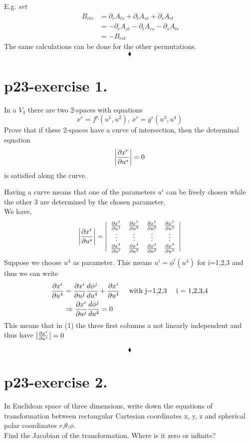 E.g. $srt$
\begin{align}
\ B_{rts} &= \partial_{r}{A_{ts}}+\partial_{t}{A_{sr}}+\partial_{s}{A_{rt}}\\
&= -\partial_{r}{A_{st}}-\partial_{t}{A_{rs}}-\partial_{s}{A_{tr}}\\
&= - B_{rst}
\end{align}
The same calculations can be done for the other permutations.
$$\blacklozenge$$
\pagebreak[4]

\section{p23-exercise 1.}
\begin{tcolorbox}
In a $V_{4}$ there are two 2-spaces with equations
$$x^r = f^r(u^1,u^2)\text{, }x^r = g^r(u^3,u^4) $$
Prove that if these 2-spaces have a curve of intersection, then the determinal equation
$$\left|\pdv{x^r}{u^s}\right| = 0$$
is satisfied along the curve.
\end{tcolorbox}
Having a curve means that one of the parameters $u^i$ can be freely chosen while the other 3 are determined by the chosen parameter.\\
We have,
\begin{align}
\left|\pdv{x^r}{u^s}\right| = \left| {\begin{array}{cccc}
    \pdv{x^1}{u^1} & \pdv{x^1}{u^2} & \pdv{x^1}{u^3} & \pdv{x^1}{u^4}\\
    \vdots & \vdots & \vdots & \vdots\\
    \pdv{x^4}{u^1} & \pdv{x^4}{u^2} & \pdv{x^4}{u^3} & \pdv{x^4}{u^4}\\
  \end{array} } \right|
\end{align}
Suppose we choose $u^4$ as parameter.
This means $u^i = \phi^i(u^4)$ for i=1,2,3 and thus we can write
\begin{align}
\pdv{x^i}{u^4} &= \pdv{x^i}{u^j}\dv{\phi^j}{u^4}+ \pdv{x^i}{u^4}\quad\text{ with j=1,2,3} \quad\text{  i = 1,2,3,4}\\
&\Rightarrow \pdv{x^i}{u^j}\dv{\phi^j}{u^4} = 0
\end{align}
This means that in (1) the three first columns a not linearly independent and thus have   $\left|\pdv{x^r}{u^s}\right| = 0$

$$\blacklozenge$$
\pagebreak[4]

\section{p23-exercise 2.}
\begin{tcolorbox}
In Euclidean space of three dimensions, write down the equations of transformation between rectangular Cartesian coordinates x, y, z and spherical polar coordinates $r$,$\theta$,$\phi$.\\
Find the Jacobian of the transformation. Where is it zero or infinite?
\end{tcolorbox}

